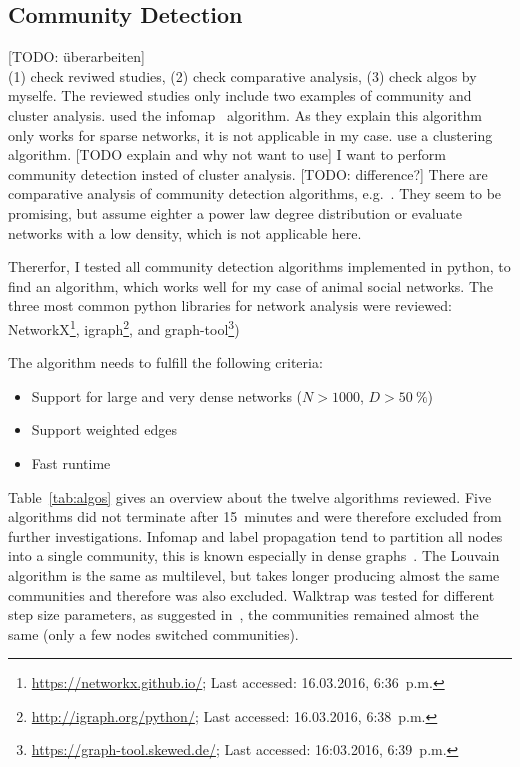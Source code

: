 \subsection{Community Detection}
\label{subsec:APcommunityDet}
[TODO: überarbeiten]\\
(1) check reviwed studies, (2) check comparative analysis, (3) check algos by myselfe.
The reviewed studies only include two examples of community and cluster analysis.
\textcite{mersch2013tracking} used the infomap~\cite{rosvall2009map,rosvall2007information} algorithm. As they explain this algorithm only works for sparse networks, it is not applicable in my case. \textcite{baracchi2014socio} use a clustering algorithm. [TODO explain and why not want to use] I want to perform community detection insted of cluster analysis. [TODO: difference?]
There are comparative analysis of community detection algorithms, e.g.~\cite{yang2016comparative, harenberg2014community}. They seem to be promising, but assume eighter a power law degree distribution or evaluate networks with a low density, which is not applicable here.

Thererfor, I tested all community detection algorithms implemented in python, to find an algorithm, which works well for my case of animal social networks. The three most common python libraries for network analysis were reviewed: NetworkX\footnote{\url{https://networkx.github.io/}; Last accessed: 16.03.2016, 6:36~p.m.}, igraph\footnote{\url{http://igraph.org/python/}; Last accessed: 16.03.2016, 6:38~p.m.}, and graph-tool\footnote{\url{https://graph-tool.skewed.de/}; Last accessed: 16:03.2016, 6:39~p.m.})

The algorithm needs to fulfill the following criteria:

\begin{itemize}
\item Support for large and very dense networks ($N>1000$, $D>50~\%$)
\item Support weighted edges
\item Fast runtime
\end{itemize}

Table~\ref{tab:algos} gives an overview about the twelve algorithms reviewed. Five algorithms did not terminate after 15~minutes and were therefore excluded from further investigations. Infomap and label propagation tend to partition all nodes into a single community, this is known especially in dense graphs~\cite{yang2016comparative, fortunato2010community}.
The Louvain algorithm is the same as multilevel, but takes longer producing almost the same communities and therefore was also excluded. Walktrap was tested for different step size parameters, as suggested in~\cite{pons2005computing}, the communities remained almost the same (only a few nodes switched communities). 

